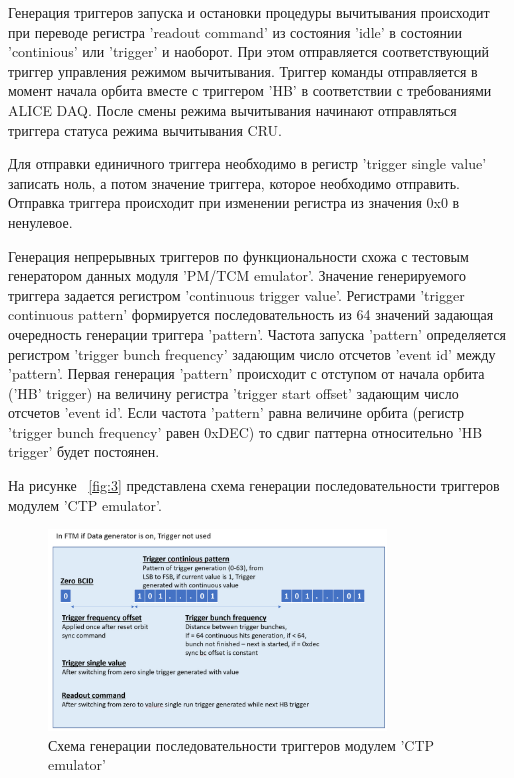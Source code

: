 \documentclass{article}
\begin{document}
Генерация триггеров запуска и остановки процедуры вычитывания происходит при переводе регистра 'readout command' из состояния 'idle' в состоянии 'continious' или 'trigger' и наоборот. При этом отправляется соответствующий триггер управления режимом вычитывания. Триггер команды отправляется в момент начала орбита вместе с триггером 'HB' в соответствии с требованиями ALICE DAQ. После смены режима вычитывания начинают отправляться триггера статуса режима вычитывания CRU.

Для отправки единичного триггера необходимо в регистр 'trigger single value' записать ноль, а потом значение триггера, которое необходимо отправить. Отправка триггера происходит при изменении регистра из значения 0x0 в ненулевое.



Генерация непрерывных триггеров по функциональности схожа с тестовым генератором данных модуля 'PM/TCM emulator'. Значение генерируемого триггера задается регистром 'continuous trigger value'. Регистрами 'trigger continuous pattern' формируется последовательность из 64 значений задающая очередность генерации триггера 'pattern'. Частота запуска 'pattern' определяется регистром 'trigger bunch frequency' задающим число отсчетов 'event id' между 'pattern'. Первая генерация 'pattern' происходит с отступом от начала орбита ('HB' trigger) на величину регистра 'trigger start offset' задающим число отсчетов 'event id'. Если частота 'pattern' равна величине орбита (регистр 'trigger bunch frequency' равен 0xDEC) то сдвиг паттерна относительно 'HB trigger' будет постоянен. 

На рисунке ~\ref{fig:3} представлена схема генерации последовательности триггеров модулем 'CTP emulator'.

\begin{figure}[H]
	\centering 
	\includegraphics[width=0.8\textwidth]{trigger generator.png}
	\caption{\label{fig:4} Схема генерации последовательности триггеров модулем 'CTP emulator'}
\end{figure}
\end{document}
